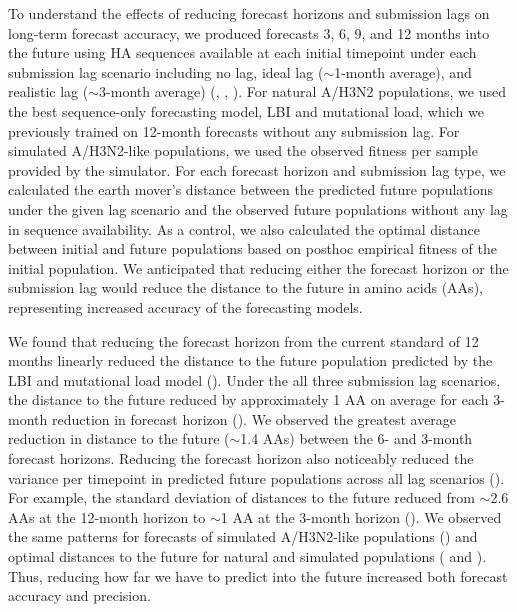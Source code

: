 \documentclass[9pt,lineno]{elife}
\begin{document}
To understand the effects of reducing forecast horizons and submission lags on long-term forecast accuracy, we produced forecasts 3, 6, 9, and 12 months into the future using HA sequences available at each initial timepoint under each submission lag scenario including no lag, ideal lag ($\sim$1-month average), and realistic lag ($\sim$3-month average) (, , ).
For natural A/H3N2 populations, we used the best sequence-only forecasting model, LBI and mutational load, which we previously trained on 12-month forecasts without any submission lag.
For simulated A/H3N2-like populations, we used the observed fitness per sample provided by the simulator.
For each forecast horizon and submission lag type, we calculated the earth mover's distance between the predicted future populations under the given lag scenario and the observed future populations without any lag in sequence availability.
As a control, we also calculated the optimal distance between initial and future populations based on posthoc empirical fitness of the initial population.
We anticipated that reducing either the forecast horizon or the submission lag would reduce the distance to the future in amino acids (AAs), representing increased accuracy of the forecasting models.

We found that reducing the forecast horizon from the current standard of 12 months linearly reduced the distance to the future population predicted by the LBI and mutational load model ().
Under the all three submission lag scenarios, the distance to the future reduced by approximately 1 AA on average for each 3-month reduction in forecast horizon ().
We observed the greatest average reduction in distance to the future ($\sim$1.4 AAs) between the 6- and 3-month forecast horizons.
Reducing the forecast horizon also noticeably reduced the variance per timepoint in predicted future populations across all lag scenarios ().
For example, the standard deviation of distances to the future reduced from $\sim$2.6 AAs at the 12-month horizon to $\sim$1 AA at the 3-month horizon ().
We observed the same patterns for forecasts of simulated A/H3N2-like populations () and optimal distances to the future for natural and simulated populations ( and ).
Thus, reducing how far we have to predict into the future increased both forecast accuracy and precision.
\end{document}
